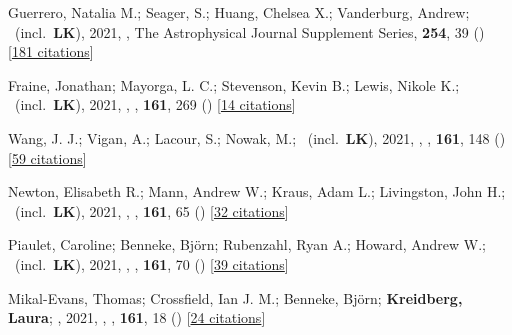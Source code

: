 \item[{\color{numcolor}\scriptsize53}] Guerrero, Natalia M.; Seager, S.; Huang, Chelsea X.; Vanderburg, Andrew; \etal\ (incl.\ \textbf{LK}), 2021, , The Astrophysical Journal Supplement Series, \textbf{254}, 39 () [\href{https://ui.adsabs.harvard.edu/abs/2021ApJS..254...39G}{181 citations}]

\item[{\color{numcolor}\scriptsize52}] Fraine, Jonathan; Mayorga, L. C.; Stevenson, Kevin B.; Lewis, Nikole K.; \etal\ (incl.\ \textbf{LK}), 2021, , \aj, \textbf{161}, 269 () [\href{https://ui.adsabs.harvard.edu/abs/2021AJ....161..269F}{14 citations}]

\item[{\color{numcolor}\scriptsize51}] Wang, J. J.; Vigan, A.; Lacour, S.; Nowak, M.; \etal\ (incl.\ \textbf{LK}), 2021, , \aj, \textbf{161}, 148 () [\href{https://ui.adsabs.harvard.edu/abs/2021AJ....161..148W}{59 citations}]

\item[{\color{numcolor}\scriptsize50}] Newton, Elisabeth R.; Mann, Andrew W.; Kraus, Adam L.; Livingston, John H.; \etal\ (incl.\ \textbf{LK}), 2021, , \aj, \textbf{161}, 65 () [\href{https://ui.adsabs.harvard.edu/abs/2021AJ....161...65N}{32 citations}]

\item[{\color{numcolor}\scriptsize49}] Piaulet, Caroline; Benneke, Bj{\"o}rn; Rubenzahl, Ryan A.; Howard, Andrew W.; \etal\ (incl.\ \textbf{LK}), 2021, , \aj, \textbf{161}, 70 () [\href{https://ui.adsabs.harvard.edu/abs/2021AJ....161...70P}{39 citations}]

\item[{\color{numcolor}\scriptsize48}] Mikal-Evans, Thomas; Crossfield, Ian J. M.; Benneke, Bj{\"o}rn; \textbf{Kreidberg, Laura}; \etal, 2021, , \aj, \textbf{161}, 18 () [\href{https://ui.adsabs.harvard.edu/abs/2021AJ....161...18M}{24 citations}]

